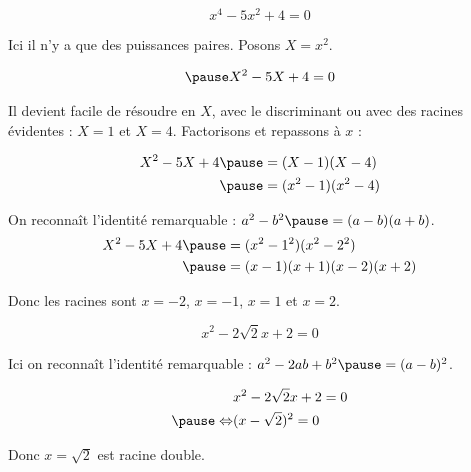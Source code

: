 \documentclass[9pt,professionalfonts,handout,hyperref]{beamer}
\begin{document}
\begin{frame}

$$x^4-5x^2+4 = 0$$

\pause Ici il n'y a que des puissances paires. \pause Posons $X = x^2$. 

\[\begin{aligned}
\pause X^2-5X+4 = 0 
\end{aligned}\]

\pause Il devient facile de résoudre en $X$, avec le discriminant ou avec des racines évidentes : \pause $X=1$ et $X=4$.\newline 
\pause Factorisons et repassons à $x$ :

\[\begin{aligned}
X^2-5X+4 
\pause &= (X-1)(X-4) \\
\pause &= (x^2-1)(x^2-4) \\
\end{aligned}\]

On reconnaît l'identité remarquable : \pause $a^2-b^2 \pause = (a-b)(a+b)$.\\

\[\begin{aligned}
X^2-5X+4 
\pause &= (x^2-1^2)(x^2-2^2) \\
\pause &= (x-1)(x+1)(x-2)(x+2) \\
\end{aligned}\]

\pause Donc les racines sont $x = -2$, $x = -1$, $x = 1$ et $x = 2$. 

\end{frame}

\begin{frame}

$$x^2 - 2\sqrt{2}x + 2 = 0$$

\bigskip 

\pause Ici on reconnaît l'identité remarquable : \pause $a^2 -2ab +b^2 \pause = (a-b)^2$. 

\[\begin{aligned}
&x^2 - 2\sqrt{2}x + 2  = 0\\
\pause \Leftrightarrow&(x -\sqrt{2})^2 = 0
\end{aligned}\]

\pause Donc $x = \sqrt{2}$ est racine double. 
\end{frame}

%
%
\end{document}
